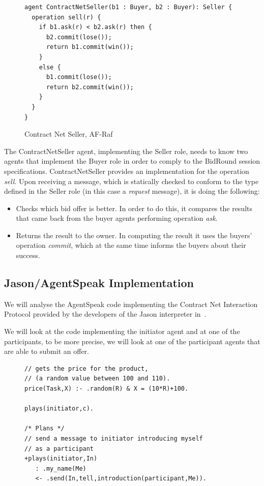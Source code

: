 \documentclass[a4paper,12pt,oneside,fleqn]{book} %
\begin{document}
{\begin{figure}
\begin{verbatim}
agent ContractNetSeller(b1 : Buyer, b2 : Buyer): Seller {
  operation sell(r) {
    if b1.ask(r) < b2.ask(r) then {
      b2.commit(lose());
      return b1.commit(win());
    }
    else {
      b1.commit(lose());
      return b2.commit(win());
    }
  }
}
\end{verbatim}
\caption{Contract Net Seller, AF-Raf}
\label{fig:contract-seller}
\end{figure} %

The ContractNetSeller agent, implementing the Seller role, needs to know
two agents that implement the Buyer role in order to comply to the BidRound
session specifications. ContractNetSeller provides an implementation for
the operation \textit{sell}. Upon receiving a message, which is statically
checked to conform to the type defined in the Seller role (in this case a
\textit{request} message), it is doing the following:

\begin{itemize}
\item Checks which bid offer is better. In order to do this, it compares the
results that came back from the buyer agents performing operation
\textit{ask}.
\item Returns the result to the owner. In computing the result it uses the
buyers' operation \textit{commit}, which at the same time informs the
buyers about their success.
\end{itemize}

\subsection{Jason/AgentSpeak Implementation} %
We will analyse the AgentSpeak code implementing the Contract Net
Interaction Protocol provided by the developers of the Jason interpreter
in~\cite{bordini2007programming}.

We will look at the code implementing the initiator agent and at one of the
participants, to be more precise, we will look at one of the participant agents
that are able to submit an offer.

\begin{figure}\footnotesize %
\begin{verbatim}
// gets the price for the product,
// (a random value between 100 and 110).
price(Task,X) :- .random(R) & X = (10*R)+100.

plays(initiator,c).

/* Plans */
// send a message to initiator introducing myself
// as a participant
+plays(initiator,In)
   : .my_name(Me)
   <- .send(In,tell,introduction(participant,Me)).


\end{verbatim}
\end{figure}}
\end{document}

